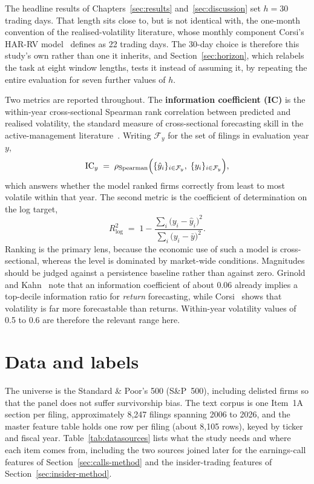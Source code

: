 \documentclass[logo,msc,ai]{infthesis}        %
\begin{document}
The headline results of Chapters~\ref{sec:results} and~\ref{sec:discussion} set $h = 30$ trading days. That length sits close to, but is not identical with, the one-month convention of the realised-volatility literature, whose monthly component Corsi's HAR-RV model~\cite{corsi2009simple} defines as 22 trading days. The 30-day choice is therefore this study's own rather than one it inherits, and Section~\ref{sec:horizon}, which relabels the task at eight window lengths, tests it instead of assuming it, by repeating the entire evaluation for seven further values of $h$.

Two metrics are reported throughout. The \textbf{information coefficient (IC)} is the within-year cross-sectional Spearman rank correlation between predicted and realised volatility, the standard measure of cross-sectional forecasting skill in the active-management literature~\cite{grinold2000active}. Writing $\mathcal{F}_{y}$ for the set of filings in evaluation year $y$,
\begin{equation}
\mathrm{IC}_{y} \;=\; \rho_{\mathrm{Spearman}} \Bigl( \{ \hat{y}_{i} \}_{i \in \mathcal{F}_{y}} , \; \{ y_{i} \}_{i \in \mathcal{F}_{y}} \Bigr) ,
\label{eq:ic}
\end{equation}
which answers whether the model ranked firms correctly from least to most volatile within that year. The second metric is the coefficient of determination on the log target,
\begin{equation}
R^{2}_{\log} \;=\; 1 - \frac{ \sum_{i} \bigl( y_{i} - \hat{y}_{i} \bigr)^{2} }{ \sum_{i} \bigl( y_{i} - \bar{y} \bigr)^{2} } .
\label{eq:r2log}
\end{equation}
Ranking is the primary lens, because the economic use of such a model is cross-sectional, whereas the level is dominated by market-wide conditions. Magnitudes should be judged against a persistence baseline rather than against zero. Grinold and Kahn~\cite{grinold2000active} note that an information coefficient of about 0.06 already implies a top-decile information ratio for \emph{return} forecasting, while Corsi~\cite{corsi2009simple} shows that volatility is far more forecastable than returns. Within-year volatility values of 0.5 to 0.6 are therefore the relevant range here.

\section{Data and labels}
\label{sec:data}
The universe is the Standard \& Poor's 500 (S\&P~500), including delisted firms so that the panel does not suffer survivorship bias. The text corpus is one Item~1A section per filing, approximately 8{,}247 filings spanning 2006 to 2026, and the master feature table holds one row per filing (about 8{,}105 rows), keyed by ticker and fiscal year. Table~\ref{tab:datasources} lists what the study needs and where each item comes from, including the two sources joined later for the earnings-call features of Section~\ref{sec:calls-method} and the insider-trading features of Section~\ref{sec:insider-method}.
\end{document}
